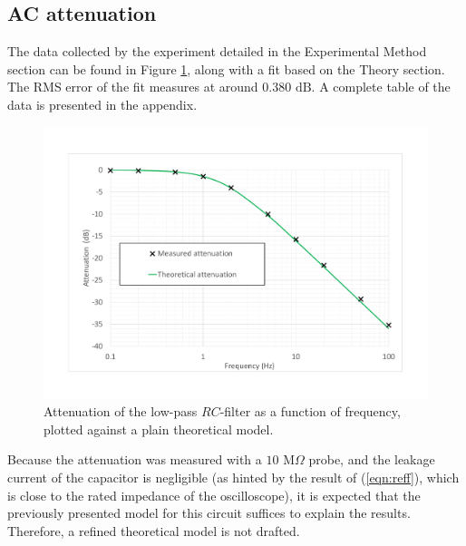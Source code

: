 \documentclass{article}
\begin{document}
\subsection{AC attenuation}
The data collected by the experiment detailed in the Experimental Method section can be found in Figure \ref{fig:ac_graph}, along with a fit based on the Theory section. The RMS error of the fit measures at around $0.380 \text{ dB}$. A complete table of the data is presented in the appendix. 
\begin{figure}
    \centering
    \includegraphics[width=\linewidth]{ac_graph.pdf}
    \caption{Attenuation of the low-pass $RC$-filter as a function of frequency, plotted against a plain theoretical model.}
    \label{fig:ac_graph}
\end{figure}
\par Because the attenuation was measured with a $10 \text{ M}\Omega$ probe, and the leakage current of the capacitor is negligible (as hinted by the result of (\ref{eqn:reff}), which is close to the rated impedance of the oscilloscope), it is expected that the previously presented model for this circuit suffices to explain the results. Therefore, a refined theoretical model is not drafted. 
\end{document}
